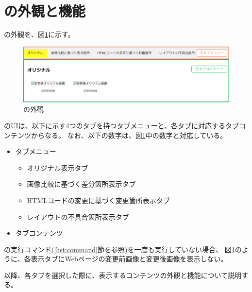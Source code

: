 \section{\toolName の外観と機能}\label{sec:MixVRT_Appearance}
\toolName の外観を、図\ref{fig: Appearance}に示す。
\begin{figure}[tp]
      \begin{center}
            \includegraphics[width=1.0\columnwidth]{image/3_Appearance3.png}
            \caption{\toolName の外観}
            \label{fig: Appearance}
      \end{center}
\end{figure}
\toolName のUIは、以下に示す4つのタブを持つタブメニューと、各タブに対応するタブコンテンツからなる。
なお、以下の数字は、図\ref{fig: Appearance}中の数字と対応している。
\begin{itemize}
      \item[①] タブメニュー
            \begin{itemize}
                  \item オリジナル表示タブ
                  \item 画像比較に基づく差分箇所表示タブ
                  \item HTMLコードの変更に基づく変更箇所表示タブ
                  \item レイアウトの不具合箇所表示タブ
            \end{itemize}
      \item[②] タブコンテンツ
\end{itemize}
\par
\toolName の実行コマンド(\ref{list:command}節を参照)を一度も実行していない場合、
図\ref{fig: Appearance}のように、各表示タブにWebページの変更前画像と変更後画像を表示しない。
\par
以降、各タブを選択した際に、表示するコンテンツの外観と機能について説明する。

